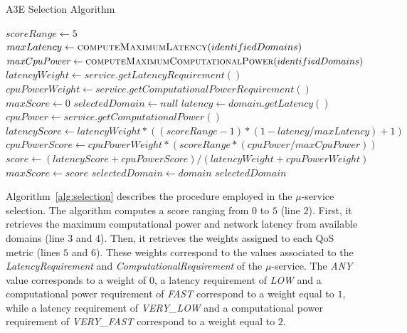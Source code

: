 \setlength{\textfloatsep}{5pt}%
{\scriptsize
\begin{algorithm}[h]
	\caption{A3E Selection Algorithm}
	\label{alg:selection}
	\begin{algorithmic}[1]		
		\State$scoreRange \gets 5$
		\State $maxLatency \gets \Call{computeMaximumLatency}{identifiedDomains}$
		\State $maxCpuPower \gets \Call{computeMaximumComputationalPower}{identifiedDomains}$
		\State $latencyWeight \gets service.getLatencyRequirement()$ 
		\State $cpuPowerWeight \gets service.getComputationalPowerRequirement()$ 
		\State $maxScore \gets 0$
		\State $selectedDomain \gets null$
		\State $latency \gets domain.getLatency()$ 
		\State $cpuPower \gets service.getComputationalPower()$ 
		\State $latencyScore \gets latencyWeight*((scoreRange-1)*(1 - latency/maxLatency)+1)$ 
		\State $cpuPowerScore \gets cpuPowerWeight*(scoreRange*(cpuPower/maxCpuPower))$
		\State $score \gets (latencyScore + cpuPowerScore) / (latencyWeight + cpuPowerWeight)$
		\State $maxScore \gets score$
		\State $selectedDomain \gets domain$
		\EndIf
		\EndFor 
		\State \Return $selectedDomain$
		\EndFunction
	\end{algorithmic}
\end{algorithm}
}%

Algorithm~\ref{alg:selection} describes the procedure employed in the $\mu$-service selection. The algorithm computes a score ranging from $0$ to $5$ (line $2$). First, it retrieves the maximum computational power and network latency from available domains (line $3$ and $4$). Then, it retrieves the weights assigned to each QoS metric (lines $5$ and $6$). These weights correspond to the values associated to the \textit{LatencyRequirement} and \textit{ComputationalRequirement} of the $\mu$-service. The \textit{ANY} value corresponds to a weight of $0$, a latency requirement of \textit{LOW} and a computational power requirement of \textit{FAST} correspond to a weight equal to $1$, while a latency requirement of \textit{VERY\_LOW} and a computational power requirement of \textit{VERY\_FAST} correspond to a weight equal to $2$. 

